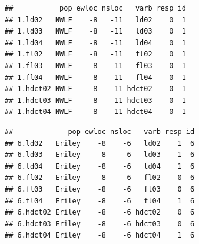 \documentclass[
  ignorenonframetext,
]{beamer}
\newenvironment{Shaded}{\begin{snugshade}}{\end{snugshade}}
\newcommand{\DecValTok}[1]{\textcolor[rgb]{0.00,0.00,0.81}{#1}}
\newcommand{\FunctionTok}[1]{\textcolor[rgb]{0.13,0.29,0.53}{\textbf{#1}}}
\newcommand{\NormalTok}[1]{#1}
\newcommand{\SpecialCharTok}[1]{\textcolor[rgb]{0.81,0.36,0.00}{\textbf{#1}}}
\begin{document}
\begin{frame}[fragile]{}
\protect\hypertarget{section-2}{}
\tiny

\begin{Shaded}
\end{Shaded}

\begin{verbatim}
##           pop ewloc nsloc   varb resp id
## 1.ld02   NWLF    -8   -11   ld02    0  1
## 1.ld03   NWLF    -8   -11   ld03    0  1
## 1.ld04   NWLF    -8   -11   ld04    0  1
## 1.fl02   NWLF    -8   -11   fl02    0  1
## 1.fl03   NWLF    -8   -11   fl03    0  1
## 1.fl04   NWLF    -8   -11   fl04    0  1
## 1.hdct02 NWLF    -8   -11 hdct02    0  1
## 1.hdct03 NWLF    -8   -11 hdct03    0  1
## 1.hdct04 NWLF    -8   -11 hdct04    0  1
\end{verbatim}

\begin{Shaded}
\end{Shaded}

\begin{verbatim}
##             pop ewloc nsloc   varb resp id
## 6.ld02   Eriley    -8    -6   ld02    1  6
## 6.ld03   Eriley    -8    -6   ld03    1  6
## 6.ld04   Eriley    -8    -6   ld04    1  6
## 6.fl02   Eriley    -8    -6   fl02    0  6
## 6.fl03   Eriley    -8    -6   fl03    0  6
## 6.fl04   Eriley    -8    -6   fl04    1  6
## 6.hdct02 Eriley    -8    -6 hdct02    0  6
## 6.hdct03 Eriley    -8    -6 hdct03    0  6
## 6.hdct04 Eriley    -8    -6 hdct04    1  6
\end{verbatim}
\end{frame}
\end{document}
